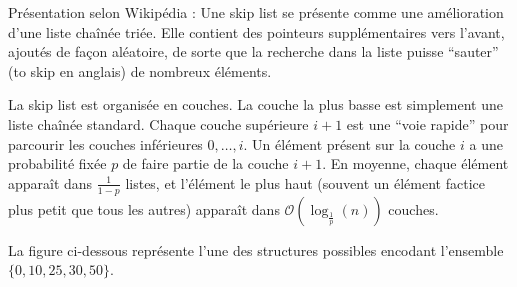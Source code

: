 
\begingroup

\begin{exercice} Présentation selon Wikipédia :
  \og Une skip list se présente comme une amélioration d'une liste chaînée triée.
  Elle contient des pointeurs supplémentaires vers l'avant, ajoutés de façon aléatoire,
  de sorte que la recherche dans la liste puisse ``sauter'' (to skip en anglais) de nombreux éléments.

  La skip list est organisée en couches. La couche la plus basse est simplement une liste chaînée standard.
  Chaque couche supérieure $i+1$ est une ``voie rapide'' pour parcourir les couches inférieures $0, \dots, i$.
  Un élément présent sur la couche $i$ a une probabilité fixée $p$ de faire partie de la couche $i+1$.
  En moyenne, chaque élément apparaît dans $\frac{1}{1-p}$ listes, et l'élément le plus haut
  (souvent un élément factice plus petit que tous les autres) apparaît dans $\mathcal{O}\left(\log_{\frac{1}{p}}(n)\right)$ couches.
  \fg

  La figure ci-dessous représente l'une des structures possibles encodant l'ensemble $\{0,10,25,30,50\}$.
  
  \vspace{2mm}

\end{exercice}
